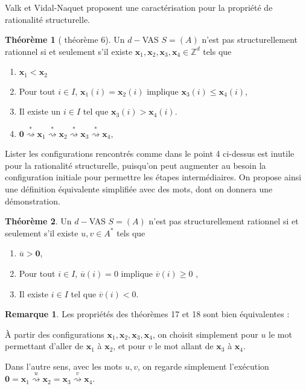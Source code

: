 \documentclass[a4paper,final]{article}
\theoremstyle{definition}
\newtheorem{Theorem}{Théorème}
\newtheorem*{Remark}{Remarque}
\let\leq\leqslant
\let\geq\geqslant
\newcommand{\Z}{\ensuremath{\mathbb{Z}}}
\newcommand{\transZ}[1]{\ensuremath{\stackrel{#1}{\rightsquigarrow}}}
\newcommand{\vect}[1]{\ensuremath{\mathbf{#1}}}
\newcommand{\valeur}[1]{\ensuremath{\overline{#1}}}
\begin{document}
Valk et Vidal-Naquet proposent une caractérisation pour la propriété de rationalité structurelle.

\begin{Theorem}[\cite{vavi81} théorème 6]
Un $d-$VAS $S=(A)$ n'est pas structurellement rationnel si et seulement s'il existe $\vect{x}_1, \vect{x}_2, \vect{x}_3, \vect{x}_4 \in \Z^d$ tels que 
\begin{enumerate}
    \item $\vect{x}_1 < \vect{x}_2$
    \item Pour tout $i \in I$, $\vect{x}_1(i) = \vect{x}_2(i)$ implique $\vect{x}_3(i) \leq \vect{x}_4(i)$,
    \item Il existe un $i\in I$ tel que $\vect{x}_3(i) > \vect{x}_4(i)$.
    
    \item $\vect{0} \transZ{*} \vect{x}_1 \transZ{*} \vect{x}_2 \transZ{*} \vect{x}_3 \transZ{*} \vect{x}_4$,
\end{enumerate}
\end{Theorem}

Lister les configurations rencontrés comme dans le point 4 ci-dessus est inutile pour la rationalité structurelle, puisqu'on peut augmenter au besoin la configuration initiale  pour permettre les étapes intermédiaires.
On propose ainsi une définition équivalente simplifiée avec des mots, dont on donnera une démonstration.


\begin{Theorem}\label{conf_struct_rat}
Un $d-$VAS $S=(A)$ n'est pas structurellement rationnel si et seulement s'il existe $u,v\in A^*$ tels que 
\begin{enumerate}
    \item $\valeur{u} > \vect{0}$,
    \item Pour tout $i \in I$, $\valeur{u}(i)=0$ implique $\valeur{v}(i) \geq 0$ ,
    \item Il existe $i\in I$ tel que $\valeur{v}(i) < 0$.
\end{enumerate}
\end{Theorem}

\begin{Remark}
Les propriétés des théorèmes 17 et 18 sont bien équivalentes :

\noindent À partir des configurations $\vect{x}_1, \vect{x}_2, \vect{x}_3, \vect{x}_4$, on choisit simplement pour $u$ le mot permettant d'aller de $\vect{x}_1$ à $\vect{x}_2$, et pour $v$ le mot allant de $\vect{x}_3$ à $\vect{x}_4$.

\noindent Dans l'autre sens, avec les mots $u,v$, on regarde simplement l'exécution $\vect{0} = \vect{x}_1 \transZ{u} \vect{x}_2 = \vect{x}_3 \transZ{v} \vect{x}_4$.
\end{Remark}
\end{document}
